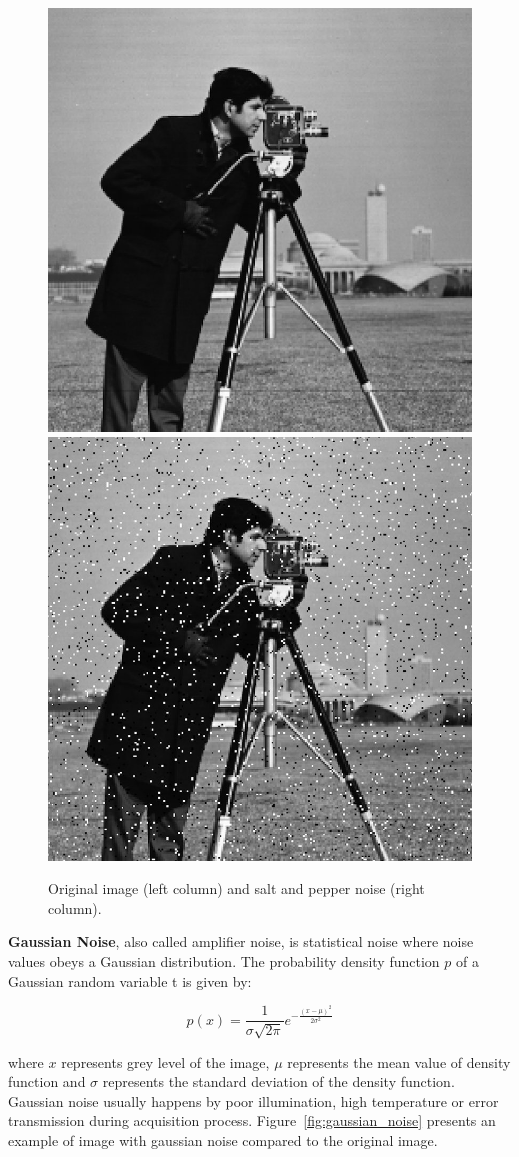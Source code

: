 \begin{figure}
    \centering 
    \includegraphics[width=0.4\columnwidth]{images/salt_pepper_origin.jpg}
    \includegraphics[width=0.4\columnwidth]{images/salt_pepper_noise.jpg}
	\caption{Original image (left column) and salt and pepper noise (right column).}
	\label{fig:salt_pepper_noise}
\end{figure}

\textbf{Gaussian Noise}, also called amplifier noise, is statistical noise where noise values obeys a Gaussian distribution. The probability density function $p$ of a Gaussian random variable t is given by: 

\begin{equation}
p(x) = {\frac{1}{\sigma {\sqrt {2\pi}}}} e^{-{\frac {(x-\mu)^{2}}{2\sigma ^{2}}}}
\end{equation}

where $x$ represents grey level of the image, $\mu$ represents the mean value of density function and $\sigma$ represents the standard deviation of the density function. Gaussian noise usually happens by poor illumination, high temperature or error transmission during acquisition process. Figure~\ref{fig:gaussian_noise} presents an example of image with gaussian noise compared to the original image.

